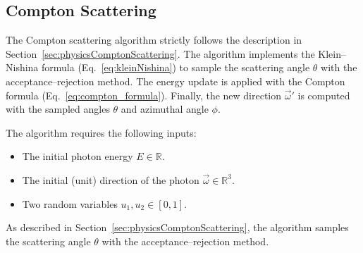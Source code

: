 \subsection{Compton Scattering}

The Compton scattering algorithm strictly follows the description in
Section~\ref{sec:physicsComptonScattering}. The algorithm implements the
Klein--Nishina formula (Eq.~\ref{eq:kleinNishina}) to sample the scattering
angle $\theta$ with the acceptance--rejection method. The energy update is
applied with the Compton formula (Eq.~\ref{eq:compton_formula}). Finally, the
new direction $\vec{\omega}'$ is computed with the sampled angles $\theta$ and
azimuthal angle $\phi$.

The algorithm requires the following inputs:
\begin{itemize}
    \item The initial photon energy $E \in \mathbb{R}$.
    \item The initial (unit) direction of the photon $\vec{\omega} \in \mathbb{R}^3$.
    \item Two random variables $u_1, u_2 \in [0,1]$.
\end{itemize}

As described in Section~\ref{sec:physicsComptonScattering}, the algorithm samples the scattering angle $\theta$ with the acceptance--rejection method.

